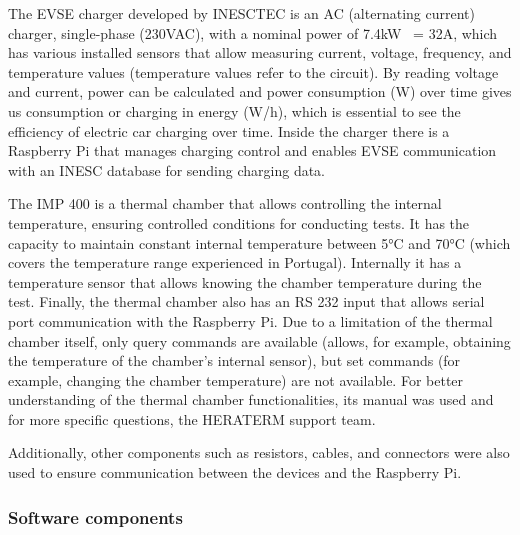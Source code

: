The EVSE charger developed by INESCTEC is an AC (alternating current) charger, single-phase (230VAC), with a nominal power of 7.4kW ~= 32A, which has various installed sensors that allow measuring current, voltage, frequency, and temperature values (temperature values refer to the circuit). By reading voltage and current, power can be calculated and power consumption (W) over time gives us consumption or charging in energy (W/h), which is essential to see the efficiency of electric car charging over time. Inside the charger there is a Raspberry Pi that manages charging control and enables EVSE communication with an INESC database for sending charging data.

The IMP 400 is a thermal chamber that allows controlling the internal temperature, ensuring controlled conditions for conducting tests. It has the capacity to maintain constant internal temperature between 5°C and 70°C (which covers the temperature range experienced in Portugal). Internally it has a temperature sensor that allows knowing the chamber temperature during the test. Finally, the thermal chamber also has an RS 232 input that allows serial port communication with the Raspberry Pi. Due to a limitation of the thermal chamber itself, only query commands are available (allows, for example, obtaining the temperature of the chamber's internal sensor), but set commands (for example, changing the chamber temperature) are not available. For better understanding of the thermal chamber functionalities, its manual \cite{chamber_manual} was used and for more specific questions, the HERATERM support team.

Additionally, other components such as resistors, cables, and connectors were also used to ensure communication between the devices and the Raspberry Pi.

\subsubsection{Software components}

